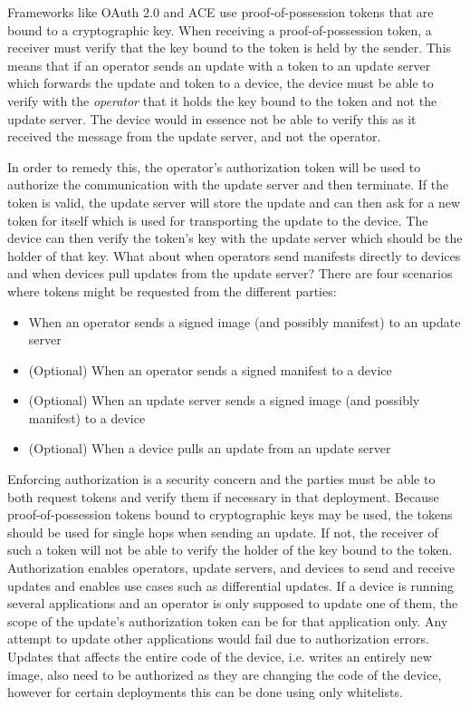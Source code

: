 \documentclass[0-thesis.tex]{subfiles}
\begin{document}
Frameworks like OAuth 2.0 and ACE use proof-of-possession tokens that are bound to a
cryptographic key. When receiving a proof-of-possession token, a receiver must verify that
the key bound to the token is held by the sender. This means that if an operator sends an
update with a token to an update server which forwards the update and token to a device,
the device must be able to verify with the \textit{operator} that it holds the key bound
to the token and not the update server. The device would in essence not be able to verify
this as it received the message from the update server, and not the operator.

In order to remedy this, the operator's authorization token will be used to authorize the
communication with the update server and then terminate. If the token is valid, the update
server will store the update and can then ask for a new token for itself which is used for
transporting the update to the device. The device can then verify the token's key with the
update server which should be the holder of that key. What about when operators send
manifests directly to devices and when devices pull updates from the update server? There
are four scenarios where tokens might be requested from the different parties:

\begin{itemize}
    \item When an operator sends a signed image (and possibly manifest) to an update
            server
    \item (Optional) When an operator sends a signed manifest to a device
    \item (Optional) When an update server sends a signed image (and possibly manifest) to a device
    \item (Optional) When a device pulls an update from an update server
\end{itemize}

Enforcing authorization is a security concern and the parties must be able to both request
tokens and verify them if necessary in that deployment. Because proof-of-possession tokens
bound to cryptographic keys may be used, the tokens should be used for single hops when
sending an update. If not, the receiver of such a token will not be able to verify the
holder of the key bound to the token. Authorization enables operators, update servers, and
devices to send and receive updates and enables use cases such as differential updates. If
a device is running several applications and an operator is only supposed to update one of
them, the scope of the update's authorization token can be for that application only. Any
attempt to update other applications would fail due to authorization errors. Updates that
affects the entire code of the device, i.e. writes an entirely new image, also need to be
authorized as they are changing the code of the device, however for certain deployments
this can be done using only whitelists.
\end{document}
